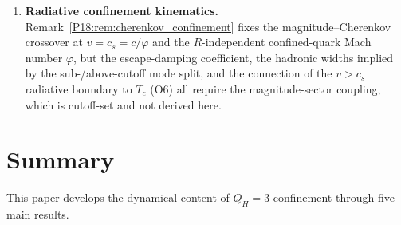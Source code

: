 \documentclass[11pt,a4paper]{article}
\theoremstyle{definition}\newtheorem{definition}[theorem]{Definition}
\theoremstyle{remark}
\newcommand{\vp}{\varphi}
\newcommand{\QH}{Q_H}
\begin{document}
\begin{enumerate}[leftmargin=2em,label=\textbf{O\arabic*.}]
\item \textbf{Radiative confinement kinematics.}
Remark~\ref{P18:rem:cherenkov_confinement} fixes the magnitude--Cherenkov
crossover at $v=c_s=c/\vp$ and the $R$-independent confined-quark Mach
number $\vp$, but the escape-damping coefficient, the hadronic widths
implied by the sub-/above-cutoff mode split, and the connection of the
$v>c_s$ radiative boundary to $T_c$ (O6) all require the magnitude-sector
coupling, which is cutoff-set and not derived here.

\end{enumerate}

\section{Summary}
\label{P18:sec:summary}

This paper develops the dynamical content of $\QH=3$ confinement
through five main results.
\end{document}
